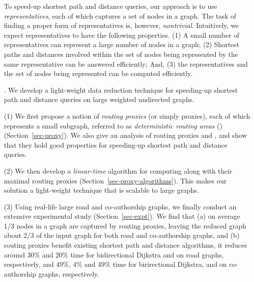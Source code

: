 To speed-up shortest  path and distance queries, our approach is to use {\em representatives}, each of which captures a set of nodes in a graph. The task of finding a proper form of representatives is, however, {\em nontrivial}. Intuitively, we expect representatives to have the following properties.
%
(1) A small number of representatives can represent a large number of nodes in a graph;
%
(2) Shortest paths and distances involved within the set of nodes being represented by the same representative can be answered efficiently; And,
%
(3) the representatives and the set of nodes being represented can be computed efficiently.


. We develop a light-weight data reduction technique for speeding-up shortest  path and distance queries on large weighted undirected graphs.

\stab (1) We first propose a notion of {\em routing proxies} (or simply proxies), each of which represents a small subgraph, referred to as  {\em deterministic routing areas} (\dras)  (Section~\ref{sec-proxy}). We also give an analysis of routing proxies and \dras, and show that they hold good properties for speeding-up shortest path and distance queries.

\stab (2) We then develop a {\em linear-time} algorithm for computing \dras along with their maximal routing proxies (Section~\ref{sec-proxy-algorithms}). This makes our solution a light-weight technique that is scalable to large graphs.


\stab (3) Using real-life large road and co-authorship graphs, we finally conduct an extensive experimental study (Section~\ref{sec-expt}).
We find that (a) on average 1/3 nodes in a graph are captured by routing proxies, leaving the reduced graph about 2/3 of the input graph for both road and co-authorship graphs, and  (b) routing proxies benefit existing shortest  path and distance algorithms, \eg it reduces around 30\% and 20\% time for  bidirectional Dijkstra \cite{LubyR89} and \arcflag \cite{MohringSSWW05} on road graphs, respectively, and 49\%, 4\% and 49\% time for birirectional Dijkstra, \arcflag and \tnr \cite{arz2013transit} on co-authorship graphs, respectively.








